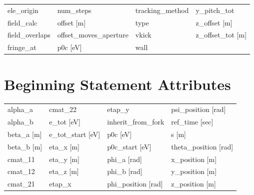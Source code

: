 \begin{tabular}{llll}
ele_origin                       & num_steps                        & tracking_method                  & y_pitch_tot                      \\
field_calc                       & offset [m]                       & type                             & z_offset [m]                     \\
field_overlaps                   & offset_moves_aperture            & vkick                            & z_offset_tot [m]                 \\
fringe_at                        & p0c [eV]                         & wall                             &                                  \\
 \bottomrule
 \end{tabular}
 \vfill
 
 \section{Beginning Statement Attributes}
 \label{s:list.beginning}
 
 \begin{tabular}{llll} \toprule
alpha_a                          & cmat_22                          & etap_y                           & psi_position [rad]               \\
alpha_b                          & e_tot [eV]                       & inherit_from_fork                & ref_time [sec]                   \\
beta_a [m]                       & e_tot_start [eV]                 & p0c [eV]                         & s [m]                            \\
beta_b [m]                       & eta_x [m]                        & p0c_start [eV]                   & theta_position [rad]             \\
cmat_11                          & eta_y [m]                        & phi_a [rad]                      & x_position [m]                   \\
cmat_12                          & eta_z [m]                        & phi_b [rad]                      & y_position [m]                   \\
cmat_21                          & etap_x                           & phi_position [rad]               & z_position [m]                   \\
 \bottomrule
 \end{tabular}
 \vfill
 
